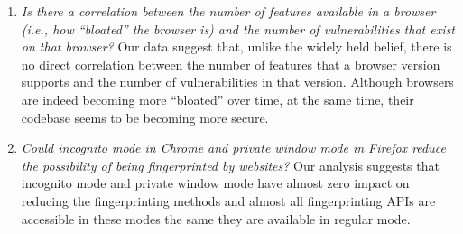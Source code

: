 \begin{enumerate}
\item {\em Is there a correlation between the number of features
    available in a browser (i.e., how ``bloated'' the browser is) and
    the number of vulnerabilities that exist on that browser?} Our
  data suggest that, unlike the widely held belief, there is no
  direct correlation between the number of features that a browser
  version supports and the number of vulnerabilities in that
  version. Although browsers are indeed becoming more ``bloated'' over
  time, at the same time, their codebase seems to be becoming more
  secure.

\item {\em Could incognito mode in Chrome and private window mode in
  Firefox reduce the possibility of being fingerprinted by websites?} Our analysis
  suggests that incognito mode and private window mode have almost zero impact on
  reducing the fingerprinting methods and almost all fingerprinting APIs are accessible in
  these modes the same they are available in regular mode.
    
\end{enumerate}

